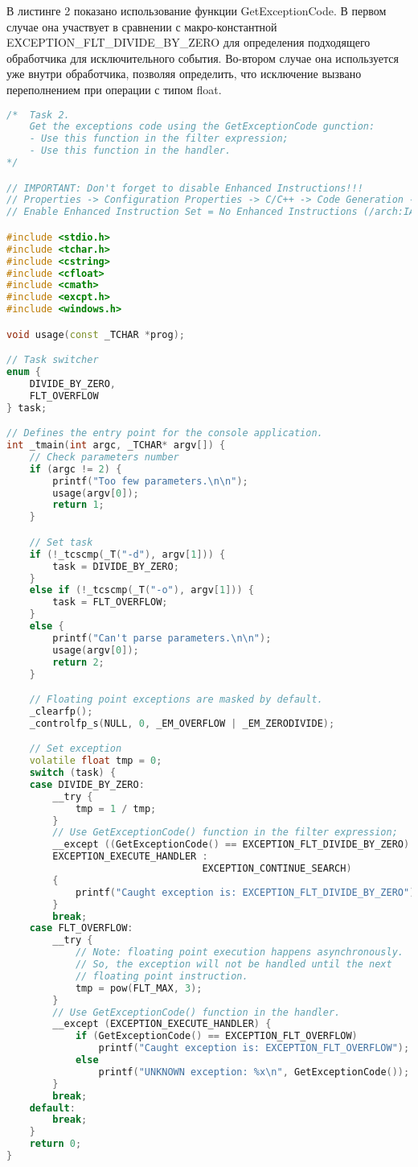 \documentclass[a4paper,12pt]{article} %
\begin{document}
В листинге 2 показано использование функции GetExceptionCode. В первом случае она участвует в сравнении с макро-константной EXCEPTION\_FLT\_DIVIDE\_BY\_ZERO для определения подходящего обработчика для исключительного события. Во-втором случае она используется уже внутри обработчика, позволяя определить, что исключение вызвано переполнением при операции с типом float.

\begin{lstlisting}[language=C++, caption={Получение кода исключения с помощью функции GetExceptionCode}]
/*  Task 2.
	Get the exceptions code using the GetExceptionCode gunction:
	- Use this function in the filter expression;
	- Use this function in the handler.
*/

// IMPORTANT: Don't forget to disable Enhanced Instructions!!!
// Properties -> Configuration Properties -> C/C++ -> Code Generation ->
// Enable Enhanced Instruction Set = No Enhanced Instructions (/arch:IA32)

#include <stdio.h>
#include <tchar.h>
#include <cstring>
#include <cfloat>
#include <cmath>
#include <excpt.h>
#include <windows.h>

void usage(const _TCHAR *prog);

// Task switcher
enum {
	DIVIDE_BY_ZERO,
	FLT_OVERFLOW
} task;

// Defines the entry point for the console application.
int _tmain(int argc, _TCHAR* argv[]) {
	// Check parameters number
	if (argc != 2) {
		printf("Too few parameters.\n\n");
		usage(argv[0]);
		return 1;
	}

	// Set task
	if (!_tcscmp(_T("-d"), argv[1])) {
		task = DIVIDE_BY_ZERO;
	}
	else if (!_tcscmp(_T("-o"), argv[1])) {
		task = FLT_OVERFLOW;
	}
	else {
		printf("Can't parse parameters.\n\n");
		usage(argv[0]);
		return 2;
	}

	// Floating point exceptions are masked by default.
	_clearfp();
	_controlfp_s(NULL, 0, _EM_OVERFLOW | _EM_ZERODIVIDE);

	// Set exception
	volatile float tmp = 0;
	switch (task) {
	case DIVIDE_BY_ZERO:
		__try {
			tmp = 1 / tmp;
		}
		// Use GetExceptionCode() function in the filter expression;
		__except ((GetExceptionCode() == EXCEPTION_FLT_DIVIDE_BY_ZERO) ?
		EXCEPTION_EXECUTE_HANDLER :
								  EXCEPTION_CONTINUE_SEARCH)
		{
			printf("Caught exception is: EXCEPTION_FLT_DIVIDE_BY_ZERO");
		}
		break;
	case FLT_OVERFLOW:
		__try {
			// Note: floating point execution happens asynchronously.
			// So, the exception will not be handled until the next
			// floating point instruction.
			tmp = pow(FLT_MAX, 3);
		}
		// Use GetExceptionCode() function in the handler.
		__except (EXCEPTION_EXECUTE_HANDLER) {
			if (GetExceptionCode() == EXCEPTION_FLT_OVERFLOW)
				printf("Caught exception is: EXCEPTION_FLT_OVERFLOW");
			else
				printf("UNKNOWN exception: %x\n", GetExceptionCode());
		}
		break;
	default:
		break;
	}
	return 0;
}


\end{lstlisting}
\end{document}
